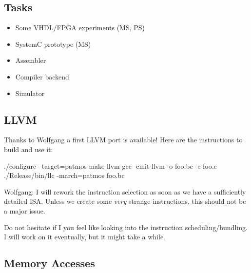 \documentclass{IEEEtran}
\newcommand{\wolf}[1]{{\color{OliveGreen} Wolfgang: #1}}
\begin{document}
\subsection{Tasks}

\begin{itemize}
\item Some VHDL/FPGA experiments (MS, PS)
\item SystemC prototype (MS)
\item Assembler
\item Compiler backend
\item Simulator
\end{itemize}


\subsection{LLVM}

Thanks to Wolfgang a first LLVM port is available! Here are the instructions to build and use it:

\begin{Java}
./configure --target=patmos
make
llvm-gcc -emit-llvm -o foo.bc -c foo.c
./Release/bin/llc -march=patmos foo.bc
\end{Java}

\wolf{I will rework the instruction selection as soon as we have a
  sufficiently detailed ISA. Unless we create some \emph{very} strange
  instructions, this should not be a major issue.

Do not hesitate if I you feel like looking into the instruction
scheduling/bundling. I will work on it eventually, but it might take a
while.}

\subsection{Memory Accesses}
\end{document}
